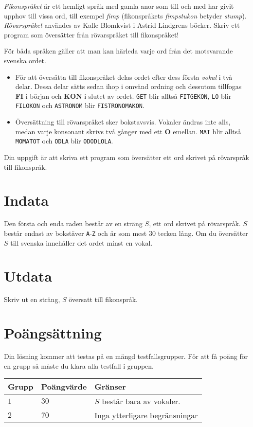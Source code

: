 \textit{Fikonspråket} är ett hemligt språk med gamla anor som till och med har givit upphov till vissa ord, 
till exempel \textit{fimp} (fikonspråkets \textit{fimpstukon} betyder \textit{stump}). 
\textit{Rövarspråket} användes av Kalle Blomkvist i Astrid Lindgrens böcker. 
Skriv ett program som översätter från rövarspråket till fikonspråket!

För båda språken gäller att man kan härleda varje ord från det motsvarande svenska ordet. 

\begin{itemize}
        \item För att översätta till fikonspråket delas ordet efter dess första \textit{vokal} i två delar. Dessa delar sätts sedan ihop i omvänd ordning och dessutom tillfogas \textbf{FI} i början och \textbf{KON} i slutet av ordet.
                \texttt{GET} blir alltså \texttt{FITGEKON}, 
                \texttt{LO} blir \texttt{FILOKON} och \texttt{ASTRONOM} blir \texttt{FISTRONOMAKON}.
        \item Översättning till rövarspråket sker bokstavsvis. 
                Vokaler ändras inte alls, medan varje konsonant skrivs två gånger med ett \textbf{O} emellan.
                \texttt{MAT} blir alltså \texttt{MOMATOT} och \texttt{ODLA} blir \texttt{ODODLOLA}.
\end{itemize}


Din uppgift är att skriva ett program som översätter ett ord skrivet på rövarspråk till fikonspråk.

\section*{Indata}
Den första och enda raden består av en sträng $S$, ett ord skrivet på rövarspråk. 
$S$ består endast av bokstäver \texttt{A}-\texttt{Z} och är som mest 30 tecken lång.
Om du översätter $S$ till svenska innehåller det ordet minst en vokal.

\section*{Utdata}
Skriv ut en sträng, $S$ översatt till fikonspråk.

\section*{Poängsättning}
Din lösning kommer att testas på en mängd testfallsgrupper. För att få poäng för en grupp så måste du klara alla testfall i gruppen.


\noindent
\begin{tabular}{| l | l | p{12cm} |}
  \hline
  Grupp & Poängvärde & Gränser \\ \hline
  $1$   & $30$       & $S$ består bara av vokaler. \\ \hline
  $2$   & $70$       & Inga ytterligare begränsningar \\ \hline
\end{tabular}
